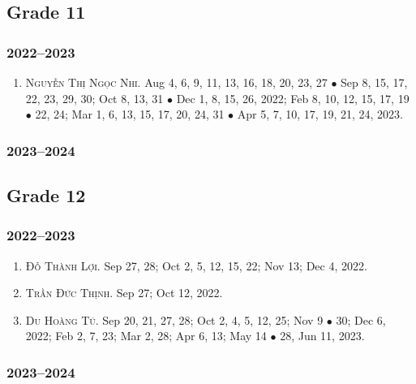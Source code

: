 \documentclass{article}
\begin{document}

\subsection{Grade 11}

\subsubsection{2022--2023}

\begin{enumerate}
	\item \textsc{Nguyễn Thị Ngọc Nhi.} {\sf[In]} Aug 4, 6, 9, 11, 13, 16, 18, 20, 23, 27 $\bullet$ Sep 8, 15, 17, 22, 23, 29, 30; Oct 8, 13, 31 $\bullet$ Dec 1, 8,  15, 26, 2022; Feb 8, 10, 12, 15, 17, 19 $\bullet$ 22, 24; Mar 1, 6, 13, 15, 17, 20, 24, 31 $\bullet$ Apr 5, 7, 10, 17, 19, 21, 24, 2023.
\end{enumerate}

\subsubsection{2023--2024}


\subsection{Grade 12}

\subsubsection{2022--2023}

\begin{enumerate}
	\item \textsc{Đỗ Thành Lợi.} {\sf[In]} Sep 27, 28; Oct 2, 5, 12, 15, 22; Nov 13; Dec 4, 2022. {\sf[Out]}
	\item \textsc{Trần Đức Thịnh.} {\sf[In]} Sep 27; Oct 12, 2022. {\sf[Out]}
	\item \textsc{Du Hoàng Tú.} {\sf[In]} Sep 20, 21, 27, 28; Oct 2, 4, 5, 12, 25; Nov 9 $\bullet$ 30; Dec 6, 2022; Feb 2, 7, 23; Mar 2, 28; Apr 6, 13; May 14 $\bullet$ 28, Jun 11, 2023. {\sf[Out]}
\end{enumerate}

\subsubsection{2023--2024}
\end{document}
